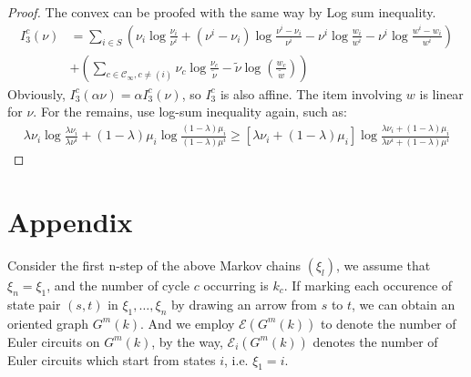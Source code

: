 \documentclass[11pt,en,cite=authoryear]{elegantpaper}
\begin{document}
\begin{proof}
    The convex can be proofed with the same way by Log sum inequality.
    \begin{align*}
        I^c_3(\nu)
        &= \sum_{i\in S} \left(\nu_{i}\log \frac{\nu_{i}}{\nu^i } + (\nu^i - \nu_i)\log \frac{\nu^i - \nu_i}{\nu^i}
        - \nu^i \log \frac{w_i}{w^i} - \nu^i \log \frac{w^i - w_i}{w^i} \right)\\
        &+ \left(\sum_{c \in \mathcal{C}_{\infty}, c\neq (i)} \nu_{c} \log \frac{\nu_{c}}{\tilde{\nu} }
        -\tilde{\nu}\log(\frac{ w_c}{\tilde{w} }) \right)
    \end{align*}
    Obviously, $I_3^c(\alpha \nu) = \alpha I_3^c( \nu)$, so $I_3^c$ is also affine.
    The item 
    involving $w$
    is linear for $\nu$. For the remains, use log-sum inequality again, such as:
    \begin{align*}
        \lambda \nu_{i}\log \frac{\lambda \nu_{i}}{\lambda \nu^i}
        + (1-\lambda) \mu_{i}\log \frac{(1-\lambda) \mu_{i}}{(1-\lambda) \mu^i}
        \ge [\lambda \nu_{i} + (1-\lambda) \mu_{i}] \log \frac{\lambda \nu_{i}+ (1-\lambda) \mu_{i}}{\lambda \nu^i +(1-\lambda) \mu^i}
    \end{align*}
\end{proof}



\section{Appendix}
Consider the first n-step of the above Markov chains $(\xi_l)$, we assume that $\xi_{n}=\xi_1$, and the number of cycle $c$ occurring is $k_{c}$.
If marking each occurence of state pair $(s, t)$ in $\xi_1, \dots, \xi_n$ by drawing an arrow from $s$ to $t$, we can obtain an oriented graph $G^m(k)$. And we employ $\mathcal{E} (G^m(k))$ to denote the number of Euler circuits on $G^m(k)$, by the way, $\mathcal{E}_i (G^m(k))$ denotes the number of Euler circuits which start from states $i$, i.e. $\xi_1 = i$.
\end{document}
